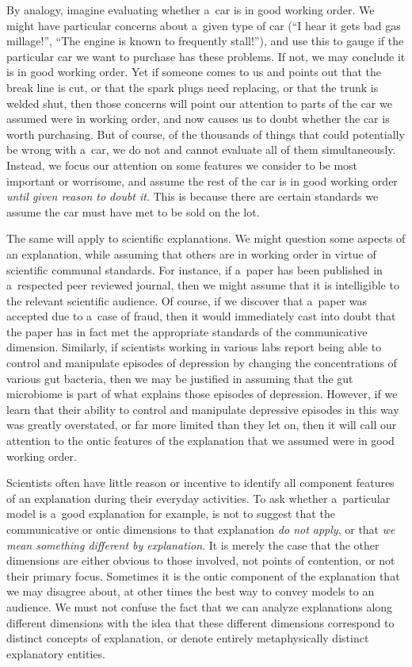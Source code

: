 By analogy, imagine evaluating whether a~car is in good working order. We might have particular concerns about a~given type of car (``I hear it gets bad gas millage!'', ``The engine is known to frequently stall!''), and use this to gauge if the particular car we want to purchase has these problems. If not, we may conclude it is in good working order. Yet if someone comes to us and points out that the break line is cut, or that the spark plugs need replacing, or that the trunk is welded shut, then those concerns will point our attention to parts of the car we assumed were in working order, and now causes us to doubt whether the car is worth purchasing. But of course, of the thousands of things that could potentially be wrong with a~car, we do not and cannot evaluate all of them simultaneously. Instead, we focus our attention on some features we consider to be most important or worrisome, and assume the rest of the car is in good working order \textit{until given reason to doubt it}. This is because there are certain standards we assume the car must have met to be sold on the lot.

The same will apply to scientific explanations. We might question some aspects of an explanation, while assuming that others are in working order in virtue of scientific communal standards. For instance, if a~paper has been published in a~respected peer reviewed journal, then we might assume that it is intelligible to the relevant scientific audience. Of course, if we discover that a~paper was accepted due to a~case of fraud, then it would immediately cast into doubt that the paper has in fact met the appropriate standards of the communicative dimension. Similarly, if scientists working in various labs report being able to control and manipulate episodes of depression by changing the concentrations of various gut bacteria, then we may be justified in assuming that the gut microbiome is part of what explains those episodes of depression. However, if we learn that their ability to control and manipulate depressive episodes in this way was greatly overstated, or far more limited than they let on, then it will call our attention to the ontic features of the explanation that we assumed were in good working order.

Scientists often have little reason or incentive to identify all component features of an explanation during their everyday activities. To ask whether a~particular model is a~good explanation for example, is not to suggest that the communicative or ontic dimensions to that explanation \textit{do not apply}, or that \textit{we mean something different by explanation}. It is merely the case that the other dimensions are either obvious to those involved, not points of contention, or not their primary focus. Sometimes it is the ontic component of the explanation that we may disagree about, at other times the best way to convey models to an audience. We must not confuse the fact that we can analyze explanations along different dimensions with the idea that these different dimensions correspond to distinct concepts of explanation, or denote entirely metaphysically distinct explanatory entities.

